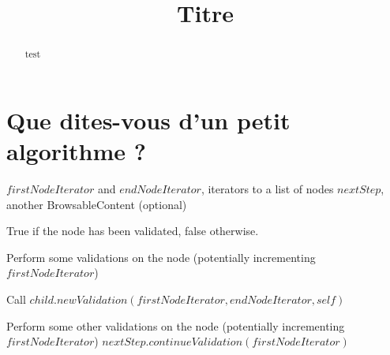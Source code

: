 




\title{Titre}


\maketitle

\begin{abstract}
test
\end{abstract}

\tableofcontents

\section{Que dites-vous d'un petit algorithme ?}
\begin{algo}[newValidation]
	\REQUIRE $firstNodeIterator$ and $endNodeIterator$, iterators to a list of nodes
	\REQUIRE $nextStep$, another BrowsableContent (optional)

	\ENSURE True if the node has been validated, false otherwise.

	\STATE Perform some validations on the node (potentially incrementing $firstNodeIterator$)

		\STATE Call $child.newValidation(firstNodeIterator, endNodeIterator, self)$
	\ENDFOR
	
	\STATE Perform some other validations on the node (potentially incrementing $firstNodeIterator$)
			\RETURN $nextStep.continueValidation(firstNodeIterator)$
		\ELSE
				\RETURN \TRUE
			\ELSE
				\RETURN \FALSE
			\ENDIF
		\ENDIF

	\ELSE
		\RETURN \FALSE
	\ENDIF
\end{algo}

%


